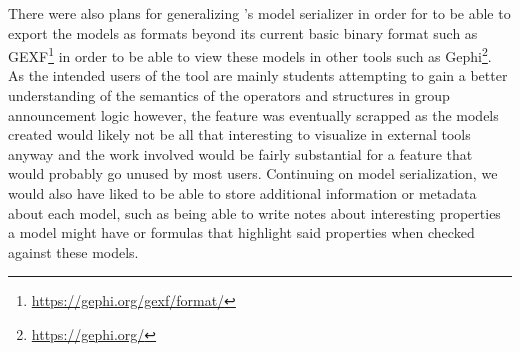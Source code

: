 There were also plans for generalizing \cname{}'s model serializer in order for to be able to export the models as formats beyond its current basic binary format such as GEXF\footnote{\url{https://gephi.org/gexf/format/}} in order to be able to view these models in other tools such as Gephi\footnote{\url{https://gephi.org/}}. As the intended users of the tool are mainly students attempting to gain a better understanding of the semantics of the operators and structures in group announcement logic however, the feature was eventually scrapped as the models created would likely not be all that interesting to visualize in external tools anyway and the work involved would be fairly substantial for a feature that would probably go unused by most users.  Continuing on model serialization, we would also have liked to be able to store additional information or metadata about each model, such as being able to write notes about interesting properties a model might have or formulas that highlight said properties when checked against these models. 